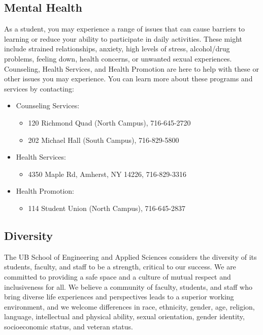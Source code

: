 \documentclass{article}
\begin{document}
\subsection{Mental Health}
As a student, you may experience a range of issues that can cause barriers to learning or reduce your ability to participate in daily activities. These might include strained relationships, anxiety, high levels of stress, alcohol/drug problems, feeling down, health concerns, or unwanted sexual experiences. Counseling, Health Services, and Health Promotion are here to help with these or other issues you may experience. You can learn more about these programs and services by contacting:
\begin{itemize}
    \item Counseling Services:
          \begin{itemize}
              \item 120 Richmond Quad (North Campus), 716-645-2720
              \item 202 Michael Hall (South Campus), 716-829-5800
          \end{itemize}
    \item Health Services:
          \begin{itemize}
              \item 4350 Maple Rd, Amherst, NY 14226, 716-829-3316
          \end{itemize}
    \item Health Promotion:
          \begin{itemize}
              \item 114 Student Union (North Campus), 716-645-2837
          \end{itemize}
\end{itemize}

\subsection{Diversity}
The UB School of Engineering and Applied Sciences considers the diversity of its students, faculty, and staff to be a strength, critical to our success. We are committed to providing a safe space and a culture of mutual respect and inclusiveness for all. We believe a community of faculty, students, and staff who bring diverse life experiences and perspectives leads to a superior working environment, and we welcome differences in race, ethnicity, gender, age, religion, language, intellectual and physical ability, sexual orientation, gender identity, socioeconomic status, and veteran status.
\end{document}
